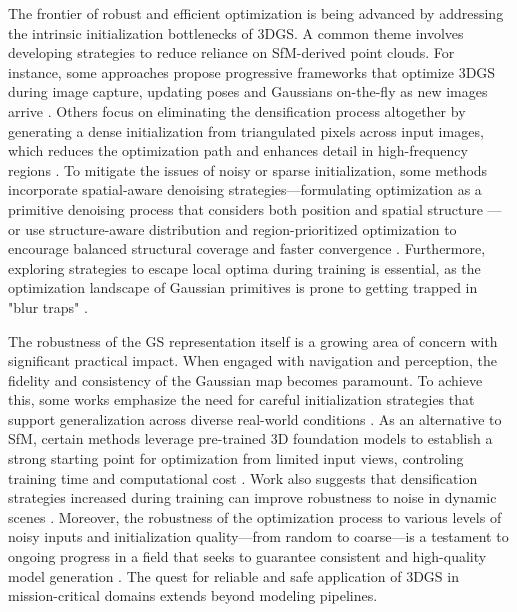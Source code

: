 \documentclass[11pt,a4paper]{article}
\begin{document}
The frontier of robust and efficient optimization is being advanced by addressing the intrinsic initialization bottlenecks of 3DGS. A common theme involves developing strategies to reduce reliance on SfM-derived point clouds. For instance, some approaches propose progressive frameworks that optimize 3DGS during image capture, updating poses and Gaussians on-the-fly as new images arrive \cite{arxiv:2503.13086v2}. Others focus on eliminating the densification process altogether by generating a dense initialization from triangulated pixels across input images, which reduces the optimization path and enhances detail in high-frequency regions \cite{arxiv:2504.13204v2}. To mitigate the issues of noisy or sparse initialization, some methods incorporate spatial-aware denoising strategies---formulating optimization as a primitive denoising process that considers both position and spatial structure \cite{arxiv:2605.14880v1}---or use structure-aware distribution and region-prioritized optimization to encourage balanced structural coverage and faster convergence \cite{arxiv:2411.12788v2}. Furthermore, exploring strategies to escape local optima during training is essential, as the optimization landscape of Gaussian primitives is prone to getting trapped in "blur traps" \cite{arxiv:2607.17965v1}.

The robustness of the GS representation itself is a growing area of concern with significant practical impact. When engaged with navigation and perception, the fidelity and consistency of the Gaussian map becomes paramount. To achieve this, some works emphasize the need for careful initialization strategies that support generalization across diverse real-world conditions \cite{arxiv:2404.12547v2,arxiv:2603.20714v3,arxiv:2403.09413v1}. As an alternative to SfM, certain methods leverage pre-trained 3D foundation models to establish a strong starting point for optimization from limited input views, controling training time and computational cost \cite{arxiv:2607.03209v1}. Work also suggests that densification strategies increased during training can improve robustness to noise in dynamic scenes \cite{arxiv:2506.02751v3}. Moreover, the robustness of the optimization process to various levels of noisy inputs and initialization quality---from random to coarse---is a testament to ongoing progress in a field that seeks to guarantee consistent and high-quality model generation \cite{arxiv:2506.23611v1,arxiv:2607.17965v1}. The quest for reliable and safe application of 3DGS in mission-critical domains extends beyond modeling pipelines.
\end{document}
